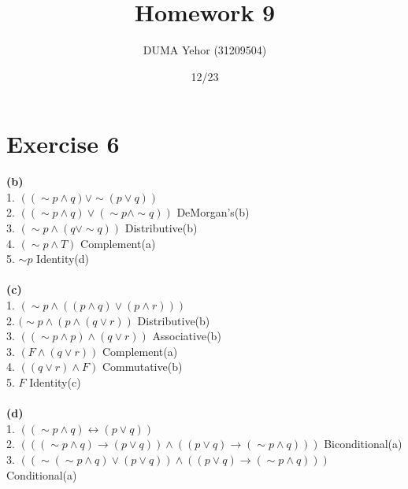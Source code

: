 \documentclass{article}
\title{Homework 9}
\author{DUMA Yehor (31209504)}
\date{12/23}
\begin{document}
\maketitle
\section{Exercise 6}

\textbf{(b)} \\
1. $((\sim p \wedge q)\vee \sim (p \vee q))$ \\
2. $((\sim p \wedge q)\vee (\sim p \wedge \sim q)) $ \hspace*{\fill} DeMorgan's(b) \\
3. $(\sim p \wedge (q \vee \sim q))$ \hspace*{\fill} Distributive(b) \\
4. $(\sim p \wedge T)$ \hspace*{\fill} Complement(a) \\
5. $\sim p$\hspace*{\fill} Identity(d)\\ \\
\textbf{(c)} \\
1. $(\sim p \wedge ((p \wedge q) \vee (p \wedge r)))$ \\
2. $( \sim p \wedge (p \wedge(q \vee r)) $ \hspace*{\fill}Distributive(b) \\
3. $(( \sim p \wedge p) \wedge (q \vee r)) $ \hspace*{\fill} Associative(b) \\
3. $(F \wedge (q \vee r))$ \hspace*{\fill} Complement(a) \\
4. $((q \vee r) \wedge F)$ \hspace*{\fill} Commutative(b) \\
5. $F$ \hspace*{\fill} Identity(c) \\ \\ 
\textbf{(d)} \\
1. $(( \sim p \wedge q) \leftrightarrow (p\vee q))$ \\
2. $(((\sim p \wedge q) \rightarrow (p \vee q)) \wedge ((p \vee q) \rightarrow ( \sim p \wedge q))) $ \hspace*{\fill} Biconditional(a) \\
3. $((\sim (\sim p \wedge q) \vee (p \vee q)) \wedge ((p \vee q) \rightarrow ( \sim p \wedge q))) $ \hspace*{\fill} Conditional(a) \\
\end{document}
